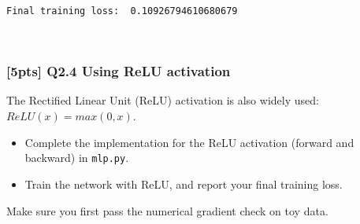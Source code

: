 \documentclass[11pt]{article}
\providecommand{\tightlist}{%
      \setlength{\itemsep}{0pt}\setlength{\parskip}{0pt}}
\begin{document}
    \begin{Verbatim}[commandchars=\\\{\}]
Final training loss:  0.10926794610680679

    \end{Verbatim}

    \begin{center}
    \end{center}
    { \hspace*{\fill} \\}
    
    \hypertarget{pts-q2.4-using-relu-activation}{%
\subsubsection{{[}5pts{]} Q2.4 Using ReLU
activation}\label{pts-q2.4-using-relu-activation}}

The Rectified Linear Unit (ReLU) activation is also widely used:
\(ReLU(x)=max(0,x)\).

\begin{itemize}
\tightlist
\item
  Complete the implementation for the ReLU activation (forward and
  backward) in \texttt{mlp.py}.
\item
  Train the network with ReLU, and report your final training loss.
\end{itemize}

Make sure you first pass the numerical gradient check on toy data.
\end{document}
